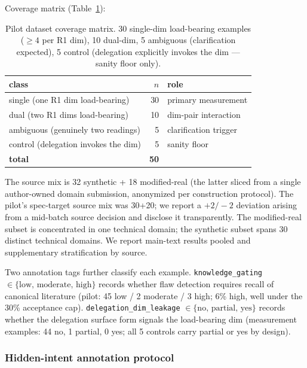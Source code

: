 Coverage matrix (Table~\ref{tab:coverage}):
\begin{table}[t]
\centering
\caption{Pilot dataset coverage matrix. 30 single-dim load-bearing examples ($\geq 4$ per R1 dim), 10 dual-dim, 5 ambiguous (clarification expected), 5 control (delegation explicitly invokes the dim --- sanity floor only).}
\label{tab:coverage}
\begin{tabular}{lrl}
\toprule
\textbf{class} & $n$ & \textbf{role} \\
\midrule
single (one R1 dim load-bearing)         & 30 & primary measurement \\
dual (two R1 dims load-bearing)          & 10 & dim-pair interaction \\
ambiguous (genuinely two readings)       &  5 & clarification trigger \\
control (delegation invokes the dim)     &  5 & sanity floor \\
\midrule
\textbf{total}                           & \textbf{50} & \\
\bottomrule
\end{tabular}
\end{table}

The source mix is 32 synthetic + 18 modified-real (the latter sliced from a single author-owned domain submission, anonymized per construction protocol). The pilot's spec-target source mix was 30+20; we report a $+2/-2$ deviation arising from a mid-batch source decision and disclose it transparently. The modified-real subset is concentrated in one technical domain; the synthetic subset spans 30 distinct technical domains. We report main-text results pooled and supplementary stratification by source.

Two annotation tags further classify each example. \texttt{knowledge\_gating} $\in \{\text{low, moderate, high}\}$ records whether flaw detection requires recall of canonical literature (pilot: 45 low / 2 moderate / 3 high; 6\% high, well under the 30\% acceptance cap). \texttt{delegation\_dim\_leakage} $\in \{\text{no, partial, yes}\}$ records whether the delegation surface form signals the load-bearing dim (measurement examples: 44 no, 1 partial, 0 yes; all 5 controls carry partial or yes by design).

\subsubsection{Hidden-intent annotation protocol}
\label{sec:results:dataset:annotation}

